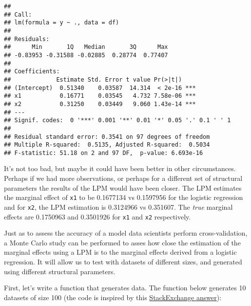 \documentclass[
]{article}
\begin{document}
\begin{verbatim}
## 
## Call:
## lm(formula = y ~ ., data = df)
## 
## Residuals:
##      Min       1Q   Median       3Q      Max 
## -0.83953 -0.31588 -0.02885  0.28774  0.77407 
## 
## Coefficients:
##             Estimate Std. Error t value Pr(>|t|)    
## (Intercept)  0.51340    0.03587  14.314  < 2e-16 ***
## x1           0.16771    0.03545   4.732 7.58e-06 ***
## x2           0.31250    0.03449   9.060 1.43e-14 ***
## ---
## Signif. codes:  0 '***' 0.001 '**' 0.01 '*' 0.05 '.' 0.1 ' ' 1
## 
## Residual standard error: 0.3541 on 97 degrees of freedom
## Multiple R-squared:  0.5135, Adjusted R-squared:  0.5034 
## F-statistic: 51.18 on 2 and 97 DF,  p-value: 6.693e-16
\end{verbatim}

It's not too bad, but maybe it could have been better in other circumstances. Perhaps if we had more
observations, or perhaps for a different set of structural parameters the results of the LPM
would have been closer. The LPM estimates the marginal effect of \texttt{x1} to be
0.1677134 vs 0.1597956
for the logistic regression and for \texttt{x2}, the LPM estimation is 0.3124966
vs 0.351607. The \emph{true} marginal effects are
0.1750963 and 0.3501926 for \texttt{x1} and \texttt{x2} respectively.

Just as to assess the accuracy of a model data scientists perform cross-validation, a Monte Carlo
study can be performed to asses how close the estimation of the marginal effects using a LPM is
to the marginal effects derived from a logistic regression. It will allow us to test with datasets
of different sizes, and generated using different structural parameters.

First, let's write a function that generates data. The function below generates 10 datasets of size
100 (the code is inspired by this \href{https://stats.stackexchange.com/a/46525}{StackExchange answer}):
\end{document}

